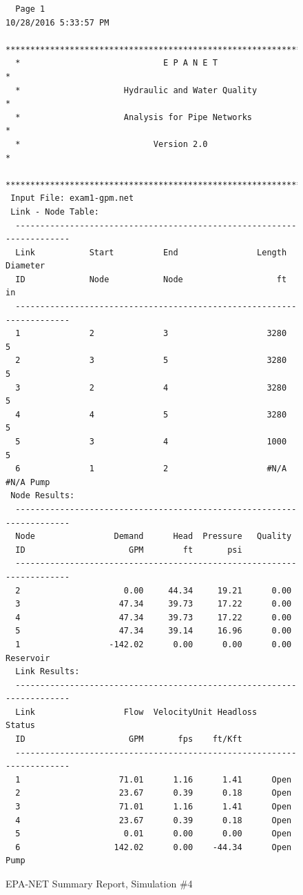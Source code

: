 \documentclass[11pt]{article}
\begin{document}
\begin{enumerate}
\begin{figure}[ht!] %
\centering

\begin{verbatim}
  Page 1                                           10/28/2016 5:33:57 PM
  **********************************************************************
  *                             E P A N E T                            *
  *                     Hydraulic and Water Quality                    *
  *                     Analysis for Pipe Networks                     *
  *                           Version 2.0                              *
  **********************************************************************
 Input File: exam1-gpm.net
 Link - Node Table:
  ----------------------------------------------------------------------
  Link           Start          End                Length  Diameter
  ID             Node           Node                   ft        in
  ----------------------------------------------------------------------
  1              2              3                    3280         5
  2              3              5                    3280         5
  3              2              4                    3280         5
  4              4              5                    3280         5
  5              3              4                    1000         5
  6              1              2                    #N/A      #N/A Pump
 Node Results:
  ----------------------------------------------------------------------
  Node                Demand      Head  Pressure   Quality
  ID                     GPM        ft       psi          
  ----------------------------------------------------------------------
  2                     0.00     44.34     19.21      0.00
  3                    47.34     39.73     17.22      0.00
  4                    47.34     39.73     17.22      0.00
  5                    47.34     39.14     16.96      0.00
  1                  -142.02      0.00      0.00      0.00 Reservoir                                                              
  Link Results:
  ----------------------------------------------------------------------
  Link                  Flow  VelocityUnit Headloss    Status
  ID                     GPM       fps    ft/Kft
  ----------------------------------------------------------------------
  1                    71.01      1.16      1.41      Open
  2                    23.67      0.39      0.18      Open
  3                    71.01      1.16      1.41      Open
  4                    23.67      0.39      0.18      Open
  5                     0.01      0.00      0.00      Open
  6                   142.02      0.00    -44.34      Open Pump
  \end{verbatim}
     \caption{EPA-NET Summary Report, Simulation \#4}
   \label{fig:epanet4} 
\end{figure}
\clearpage


\end{enumerate}
\end{document}
